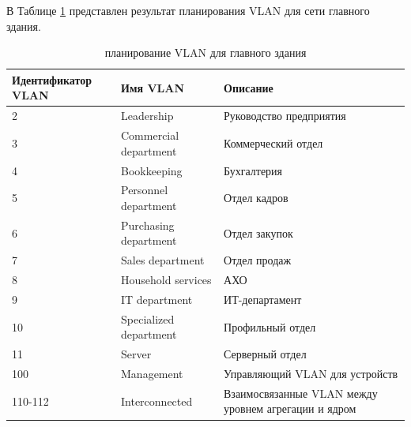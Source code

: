 \documentclass[14pt, a4paper]{extarticle}
\numberwithin{equation}{section}
\begin{document}
В Таблице \ref{table:mainDepVlan} представлен результат планирования VLAN для сети главного здания.
\begin{table}[H]
\centering
\small
\label{table:mainDepVlan}
\caption{планирование VLAN для главного здания}
\begin{tabular}{|l|l|m{6cm}|}
\hline
\textbf{Идентификатор VLAN} & \textbf{Имя VLAN} & \textbf{Описание} \\
\hline
2 & Leadership & Руководство предприятия \\
\hline
3 & Commercial department & Коммерческий отдел \\
\hline
4 & Bookkeeping & Бухгалтерия \\
\hline
5 & Personnel department & Отдел кадров \\
\hline 
6 & Purchasing department & Отдел закупок \\
\hline 
7 & Sales department & Отдел продаж \\
\hline 
8 & Household services & АХО \\
\hline 
9 & IT department & ИТ-департамент \\
\hline
10 & Specialized department & Профильный отдел \\
\hline
11 & Server & Серверный отдел \\
\hline
100 & Management & Управляющий VLAN для устройств \\
\hline
110-112 & Interconnected & Взаимосвязанные VLAN между уровнем агрегации и ядром \\
\hline
\end{tabular}
\end{table}
\end{document}
